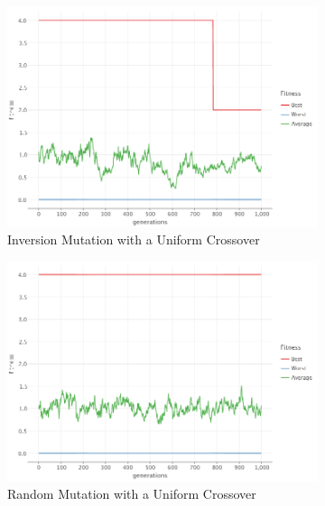     \begin{figure}[ht!]
        \centering
        \begin{subfigure}{0.35\textwidth}
            \includegraphics[width=\textwidth]{img/beacon_uniform_inv_1.png}
            \caption{Inversion Mutation with a Uniform Crossover}
            \label{fig:beacon:3:inversion}
        \end{subfigure}
        \hfill
        \begin{subfigure}{0.35\textwidth}
            \includegraphics[width=\textwidth]{img/beacon_uniform_random_1.png}
            \caption{Random Mutation with a Uniform Crossover}
            \label{fig:beacon:3:random}
        \end{subfigure}
        \begin{subfigure}{0.35\textwidth}

\end{subfigure}
\end{figure}
